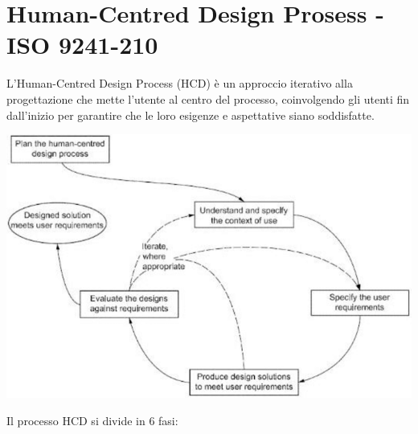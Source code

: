 \documentclass{report}
\begin{document}
	\section{Human-Centred Design Prosess - ISO 9241-210}
	L'Human-Centred Design Process (HCD) è un approccio iterativo alla progettazione che mette l'utente al centro del processo, coinvolgendo gli utenti fin dall'inizio per garantire che le loro esigenze e aspettative siano soddisfatte.
	\begin{center}
		\includegraphics[scale=0.5]{assets/hcd.png}
	\end{center}
	Il processo HCD si divide in 6 fasi:
\end{document}
